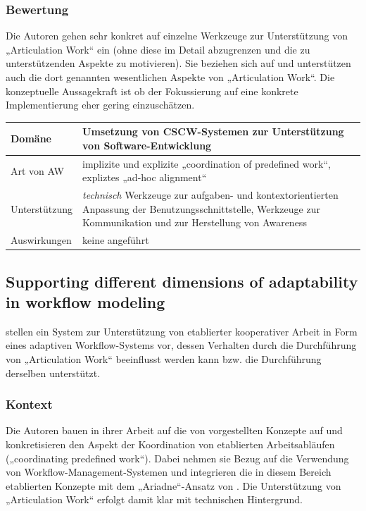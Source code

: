 \subsubsection{Bewertung}
Die Autoren gehen sehr konkret auf einzelne Werkzeuge zur Unterstützung von „Articulation Work“ ein (ohne diese im Detail abzugrenzen und die zu unterstützenden Aspekte zu motivieren). Sie beziehen sich auf \citet{Schmidt92} und unterstützen auch die dort genannten wesentlichen Aspekte von „Articulation Work“. Die konzeptuelle Aussagekraft ist ob der Fokussierung auf eine konkrete Implementierung eher gering einzuschätzen.
\\[1em]
\begin{tabular}{| p{3cm} | p{10cm} |}
  \hline
  Domäne & Umsetzung von \gls{CSCW}-Systemen zur Unterstützung von Software-Entwicklung \\ \hline
  Art von AW & implizite und explizite „coordination of predefined work“, expliztes „ad-hoc alignment“\\ \hline
  Unterstützung & \emph{technisch} Werkzeuge zur aufgaben- und kontextorientierten Anpassung der Benutzungsschnittstelle, Werkzeuge zur Kommunikation und zur Herstellung von Awareness \\ \hline
  Auswirkungen & keine angeführt \\ \hline
\end{tabular}

\subsection{Supporting different dimensions of adaptability in workflow modeling}
\label{sub:supporting_different_dimensions_of_adaptability}

\citet{Divitini00} stellen ein System zur Unterstützung von etablierter kooperativer Arbeit in Form eines adaptiven Workflow-Systems vor, dessen Verhalten durch die Durchführung von „Articulation Work“ beeinflusst werden kann bzw. die Durchführung derselben unterstützt.

\subsubsection{Kontext}

Die Autoren bauen in ihrer Arbeit auf die von \citet{Schmidt96} vorgestellten Konzepte auf und konkretisieren den Aspekt der Koordination von etablierten Arbeitsabläufen („coordinating predefined work“). Dabei nehmen sie Bezug auf die Verwendung von Workflow-Management-Systemen und integrieren die in diesem Bereich etablierten Konzepte mit dem „Ariadne“-Ansatz von \citet{Schmidt96}. Die Unterstützung von „Articulation Work“ erfolgt damit klar mit technischen Hintergrund.

